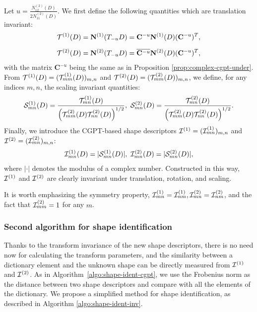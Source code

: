 Let $u=\frac{N_{12}^{(2)}(D)}{2N_{11}^{(2)}(D)}$. We first define  the
following quantities which are translation invariant:
\begin{align}
  \label{eq:shape_descrp_trans}
  \Tauo(D) &= \No(T_{-u}D) = \mathbf{C}^{-u}\No(D)(\mathbf{C}^{-u})^T, \\
  \nm
  \Taut(D) &= \Nt(T_{-u}D) = \overline{\mathbf{C}^{-u}}\Nt(D)(\mathbf{C}^{-u})^T,
\end{align}
with the matrix $\mathbf{C}^{-u}$ being the same as in Proposition
\ref{prop:complex-cgpt-under}. From $\mathcal{T}^{(1)}(D)
=(\mathcal{T}^{(1)}_{mm}(D))_{m,n}$ and $\mathcal{T}^{(2)}(D) =(\mathcal{T}^{(2)}_{mm}(D))_{m,n}$, we
define, for any indices $m,n$, the scaling invariant quantities:
\begin{align}
  \label{eq:shape_descrp_scl}
  \mathcal{S}^{(1)}_{mn}(D) =
  \frac{\mathcal{T}^{(1)}_{mn}(D)}{\left(\mathcal{T}^{(2)}_{mm}(D)\mathcal{T}^{(2)}_{nn}(D)\right)^{1/2}}, \
  \mathcal{S}^{(2)}_{mn}(D) =
  \frac{\mathcal{T}^{(2)}_{mn}(D)}{\left(\mathcal{T}^{(2)}_{mm}(D)\mathcal{T}^{(2)}_{nn}(D)\right)^{1/2}}
  .
\end{align}
Finally, we introduce the CGPT-based shape descriptors $\mathcal{I}^{(1)} = (
\mathcal{I}^{(1)}_{mn})_{m,n}$ and $\mathcal{I}^{(2)} =  (\mathcal{I}^{(2)}_{mn})_{m,n}$:
\begin{align}
  \label{eq:shape_descrp}
  \mathcal{I}^{(1)}_{mn}(D) = |\mathcal{S}^{(1)}_{mn}(D)|, \ \mathcal{I}^{(2)}_{mn}(D) =
  |\mathcal{S}^{(2)}_{mn}(D)|,
\end{align}
where $|\cdot|$ denotes the modulus of a complex number.
Constructed in this way, $\mathcal{I}^{(1)}$ and $\mathcal{I}^{(2)}$ are clearly
invariant under translation, rotation, and scaling.

It is worth emphasizing the symmetry property, $\mathcal{I}^{(1)}_{mn} =
\mathcal{I}^{(1)}_{nm}, \mathcal{I}^{(2)}_{mn} = \mathcal{I}^{(2)}_{nm}$, and the fact that
$\mathcal{I}^{(2)}_{mm} =1$ for any $m$.

\subsubsection{Second algorithm for shape identification}\label{sec:second-algor-shape}
Thanks to the transform invariance of the new shape descriptors,
there is no need now for calculating the transform parameters, and
the similarity between a dictionary element and the unknown shape
can be directly measured from $\mathcal{I}^{(1)}$ and $\mathcal{I}^{(2)}$. As in
Algorithm~\ref{algo:shape-ident-cgpt}, we use the Frobenius norm
as the distance between two shape descriptors and compare with all
the elements of the dictionary. We propose a simplified method for
shape identification, as described in Algorithm
\ref{algo:shape-ident-inv}.


